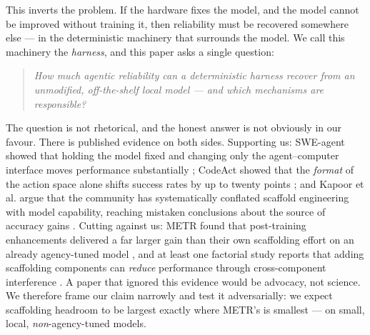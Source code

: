 \documentclass[11pt,a4paper]{article}
\begin{document}
This inverts the problem. If the hardware fixes the model, and the model cannot
be improved without training it, then reliability must be recovered somewhere
else --- in the deterministic machinery that surrounds the model. We call this
machinery the \emph{harness}, and this paper asks a single question:

\begin{quote}
\emph{How much agentic reliability can a deterministic harness recover from an
unmodified, off-the-shelf local model --- and which mechanisms are responsible?}
\end{quote}

The question is not rhetorical, and the honest answer is not obviously in our
favour. There is published evidence on both sides. Supporting us: SWE-agent
showed that holding the model fixed and changing only the agent--computer
interface moves performance substantially \citep{yang2024sweagent}; CodeAct
showed that the \emph{format} of the action space alone shifts success rates by
up to twenty points \citep{wang2024codeact}; and Kapoor et al. argue that the
community has systematically conflated scaffold engineering with model
capability, reaching mistaken conclusions about the source of accuracy gains
\citep{kapoor2025aiagents}. Cutting against us: METR found that post-training
enhancements delivered a far larger gain than their own scaffolding effort on an
already agency-tuned model \citep{metr2024elicitation}, and at least one
factorial study reports that adding scaffolding components can \emph{reduce}
performance through cross-component interference \citep{liu2026moreisnotbetter}.
A paper that ignored this evidence would be advocacy, not science. We therefore
frame our claim narrowly and test it adversarially: we expect scaffolding
headroom to be largest exactly where METR's is smallest --- on small, local,
\emph{non}-agency-tuned models.
\end{document}

